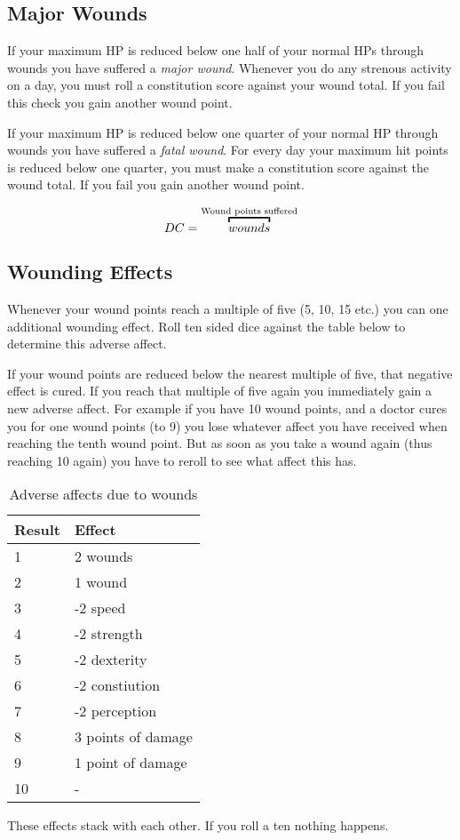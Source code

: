 \subsection{Major Wounds}

If your maximum HP is reduced below one half of your normal HPs through wounds
you have suffered a \emph{major wound}. Whenever you do any strenous activity on
a day, you must roll a constitution score against your wound total. If you fail
this check you gain another wound point.

If your maximum HP is reduced below one quarter of your normal HP through wounds
you have suffered a \emph{fatal wound}. For every day your maximum hit points is
reduced below one quarter, you must make a constitution score against the wound
total. If you fail you gain another wound point.

\[
DC = \ob{wounds}{Wound points suffered}
\]

\subsection{Wounding Effects}

Whenever your wound points reach a multiple of five (5, 10, 15 etc.) you can one
additional wounding effect. Roll ten sided dice against the table below to
determine this adverse affect.

If your wound points are reduced below the nearest multiple of five, that
negative effect is cured. If you reach that multiple of five again you
immediately gain a new adverse affect. For example if you have 10 wound points,
and a doctor cures you for one wound points (to 9) you lose whatever affect you
have received when reaching the tenth wound point. But as soon as you take a
wound again (thus reaching 10 again) you have to reroll to see what affect this
has.

\begin{table}
  \caption{Adverse affects due to wounds}
  \begin{center}
    \begin{tabular}{|l|l|}
      \hline
      Result & Effect             \\ \hline
      1      & 2 wounds           \\ \hline
      2      & 1 wound            \\ \hline
      3      & -2 speed           \\ \hline
      4      & -2 strength        \\ \hline
      5      & -2 dexterity       \\ \hline
      6      & -2 constiution     \\ \hline
      7      & -2 perception      \\ \hline
      8      & 3 points of damage \\ \hline
      9      & 1 point of damage  \\ \hline
      10     & -                  \\ \hline
    \end{tabular}
  \end{center}
\end{table}

These effects stack with each other. If you roll a ten nothing happens.
